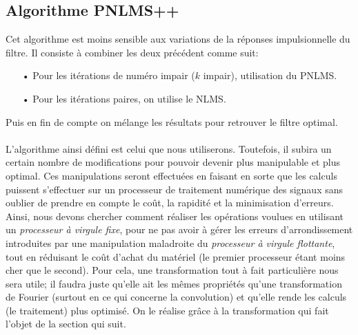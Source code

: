 \subsection{Algorithme PNLMS++ \cite{ThAlaedine}}
Cet algorithme est moins sensible aux variations de la réponses impulsionnelle du filtre. Il consiste à combiner les deux précédent comme suit:
\begin{itemize}
\item[•] Pour les itérations de numéro impair ($ k $ impair), utilisation du PNLMS.
\item[•] Pour les itérations paires, on utilise le NLMS. 
\end{itemize}
Puis en fin de compte on mélange les résultats pour retrouver le filtre optimal.\\
 \\
L'algorithme ainsi défini est celui que nous utiliserons. Toutefois, il subira un certain nombre de modifications pour pouvoir devenir plus manipulable et plus optimal. Ces manipulations seront effectuées en faisant en sorte que les calculs puissent s'effectuer sur un processeur de traitement numérique des signaux sans oublier de prendre en compte le coût, la rapidité et la minimisation d'erreurs. Ainsi, nous devons chercher comment réaliser les opérations voulues en utilisant un \emph{processeur à virgule fixe}, pour ne pas avoir à gérer les erreurs d'arrondissement introduites par une manipulation maladroite du \emph{processeur à virgule flottante}, tout en réduisant le coût d'achat du matériel (le premier processeur étant moins cher que le second). Pour cela, une transformation tout à fait particulière nous sera utile; il faudra juste qu'elle ait les mêmes propriétés qu'une transformation de Fourier (surtout en ce qui concerne la convolution) et qu'elle rende les calculs (le traitement) plus optimisé. On le réalise grâce à la transformation qui fait l'objet de la section qui suit.
